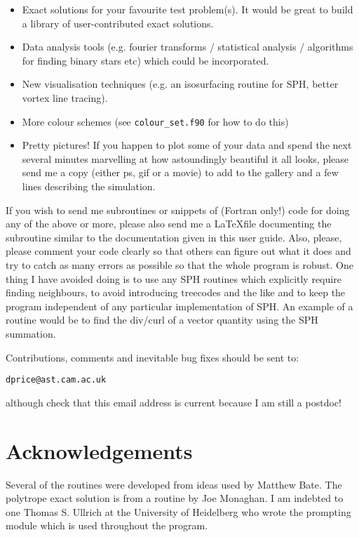 \documentclass[a4paper,12pt]{article}
\begin{document}
\begin{itemize}
\item Exact solutions for your favourite test problem(s). It would be great to
build a library of user-contributed exact solutions.
\item Data analysis tools (e.g. fourier transforms / statistical analysis /
algorithms for finding binary stars etc) which could be incorporated.
\item New visualisation techniques (e.g. an isosurfacing routine for SPH, better
vortex line tracing).
\item More colour schemes (see \verb+colour_set.f90+ for how to do this)
\item Pretty pictures! If you happen to plot some of your data and spend the
next several minutes marvelling at how astoundingly beautiful it all looks, please send
me a copy (either ps, gif or a movie) to add to the gallery and a few lines
describing the simulation.
\end{itemize}


If you wish to send me subroutines or snippets of (Fortran only!) code for doing any of the above or
more, please also send me a \LaTeX file
documenting the subroutine similar to the documentation given in this user guide.
Also, please, please comment your code clearly so that others can figure out
what it does and try to catch as many errors as possible so that the whole
program is robust.  One thing I have avoided doing is to use any SPH
routines which explicitly require finding neighbours, to avoid introducing treecodes and
the like and to keep the program independent of any particular implementation of
SPH. An example of a
routine would be to find the div/curl of a vector quantity using
the SPH summation.

Contributions, comments and inevitable bug fixes
should be sent to:
\begin{verbatim}
dprice@ast.cam.ac.uk
\end{verbatim}
although check that this email address is current because I am still a postdoc!


\section*{Acknowledgements}
 Several of the routines were developed from ideas used by Matthew Bate. The
polytrope exact solution is from a routine by Joe Monaghan. I am indebted to one
Thomas S. Ullrich at the University of Heidelberg who wrote the prompting module
which is used throughout the program.
\end{document}
